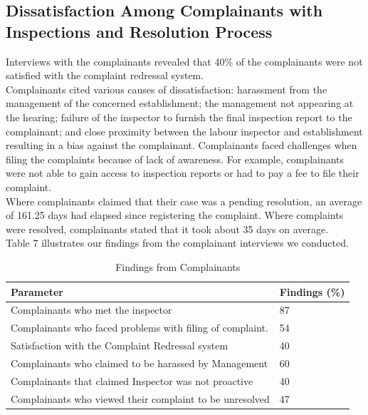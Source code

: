 \documentclass[a4paper, 12pt, twoside]{article}
\begin{document}
\subsection{Dissatisfaction Among Complainants with Inspections and Resolution Process}

Interviews with the complainants revealed that 40\% of the complainants were not satisfied with the complaint redressal system.\\ 
Complainants cited various causes of dissatisfaction: harassment from the management of the concerned establishment; the management not appearing at the hearing; failure of the inspector to furnish the final inspection report to the complainant; and close proximity between the labour inspector and establishment resulting in a bias against the complainant. Complainants faced challenges when filing the complaints because of lack of awareness. For example, complainants were not able to gain access to inspection reports or had to pay a fee to file their complaint.\\

Where complainants claimed that their case was a pending resolution, an average of 161.25 days had elapsed since registering the complaint. Where complaints were resolved, complainants stated that it took about 35 days on average.\\

Table 7 illustrates our findings from the complainant interviews we conducted.

\begin{table}[H]
	\caption{Findings from Complainants}
	\begin{tabular}{L{10cm}C{4cm}}
	\toprule
	Parameter & Findings (\%)\\
	\midrule
	Complainants who met the inspector\footnotemark & 87\\
	Complainants who faced problems with filing of complaint. & 54\\
	Satisfaction with the Complaint Redressal system & 40\\
	Complainants who claimed to be harassed by Management & 60\\
	Complainants that claimed Inspector was not proactive & 40\\
	Complainants who viewed their complaint to be unresolved & 47\\
	\bottomrule
	\end{tabular}
\end{table}
\end{document}
